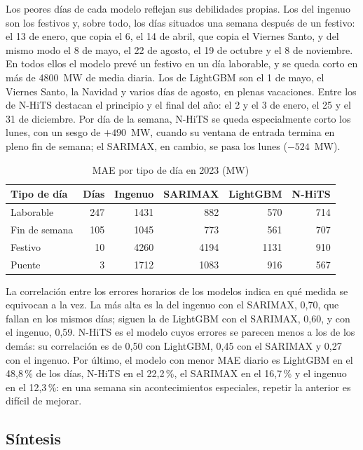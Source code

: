Los peores días de cada modelo reflejan sus debilidades propias. Los del
ingenuo son los festivos y, sobre todo, los días situados una semana después
de un festivo: el 13 de enero, que copia el 6, el 14 de abril, que copia el
Viernes Santo, y del mismo modo el 8 de mayo, el 22 de agosto, el 19 de
octubre y el 8 de noviembre. En todos ellos el modelo prevé un festivo en un
día laborable, y se queda corto en más de 4800~MW de media diaria. Los de LightGBM
son el 1 de mayo, el Viernes Santo, la Navidad y varios días de agosto, en
plenas vacaciones. Entre los de N-HiTS destacan el principio y el final del
año: el 2 y el 3 de enero, el 25 y el 31 de diciembre. Por día de la
semana, N-HiTS se queda especialmente corto los lunes, con un sesgo de
$+490$~MW, cuando su ventana de entrada termina en pleno fin de semana; el
SARIMAX, en cambio, se pasa los lunes ($-524$~MW).

\begin{table}[H]
	\centering
	\caption{MAE por tipo de día en 2023 (MW)}
	\label{tab:tipo-dia-val}
	\small
	\begin{tabular}{lrrrrr}
		\hline
		\textbf{Tipo de día} & \textbf{Días} & \textbf{Ingenuo} & \textbf{SARIMAX} & \textbf{LightGBM} & \textbf{N-HiTS} \\
		\hline
		Laborable & 247 & 1431 & 882 & 570 & 714 \\
		Fin de semana & 105 & 1045 & 773 & 561 & 707 \\
		Festivo & 10 & 4260 & 4194 & 1131 & 910 \\
		Puente & 3 & 1712 & 1083 & 916 & 567 \\
		\hline
	\end{tabular}
\end{table}

La correlación entre los errores horarios de los modelos indica en qué
medida se equivocan a la vez. La más alta es la del ingenuo con el SARIMAX,
0,70, que fallan en los mismos días; siguen la de LightGBM con el SARIMAX,
0,60, y con el ingenuo, 0,59. N-HiTS es el modelo cuyos errores se parecen
menos a los de los demás: su correlación es de 0,50 con LightGBM, 0,45 con el
SARIMAX y 0,27 con el ingenuo. Por último, el modelo con menor MAE diario es
LightGBM en el 48,8\,\% de los días, N-HiTS en el 22,2\,\%, el SARIMAX en el
16,7\,\% y el ingenuo en el 12,3\,\%: en una semana sin acontecimientos
especiales, repetir la anterior es difícil de mejorar.

\subsection{Síntesis}\label{sec:val-sintesis}

